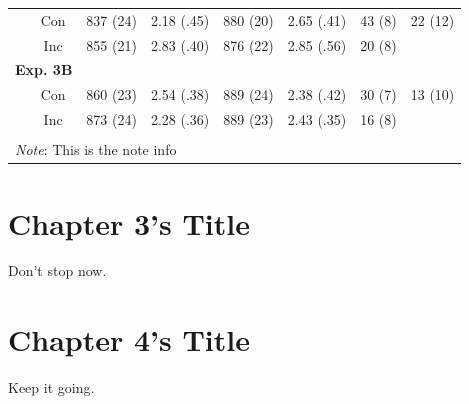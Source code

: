 \documentclass[]{DissertateCUNY}
\begin{document}
\begin{table}[htbp]
{\begin{tabular}{rrcccccc}
    & \multicolumn{1}{c}{Con} 
    & \multicolumn{1}{c}{837 (24)} 
    & \multicolumn{1}{c}{2.18 (.45)} 
    & \multicolumn{1}{c}{880 (20)} 
    & \multicolumn{1}{c}{2.65 (.41)} 
    & \multicolumn{1}{c}{43 (8)}
    & \multicolumn{1}{c}{22 (12)} \\
    & \multicolumn{1}{c}{Inc} 
    & \multicolumn{1}{c}{855 (21)} 
    & \multicolumn{1}{c}{2.83 (.40)} 
    & \multicolumn{1}{c}{876 (22)} 
    & \multicolumn{1}{c}{2.85 (.56)} 
    & \multicolumn{1}{c}{20 (8)} &  \\
    \multicolumn{2}{c}{\textbf{Exp. 3B}} &       &       &       &       &       &  \\
    & \multicolumn{1}{c}{Con} 
    & \multicolumn{1}{c}{860 (23)} 
    & \multicolumn{1}{c}{2.54 (.38)} 
    & \multicolumn{1}{c}{889 (24)} 
    & \multicolumn{1}{c}{2.38 (.42)} 
    & \multicolumn{1}{c}{30 (7)} 
    & \multicolumn{1}{c}{13 (10)} \\
    & \multicolumn{1}{c}{Inc} 
    & \multicolumn{1}{c}{873 (24)} 
    & \multicolumn{1}{c}{2.28 (.36)} 
    & \multicolumn{1}{c}{889 (23)} 
    & \multicolumn{1}{c}{2.43 (.35)} 
    & \multicolumn{1}{c}{16 (8)} &  \\
    &       &       &       &       &       &       &  \\
    \bottomrule
    \multicolumn{8}{l}{\textit{Note}: This is the note info} \\
    \end{tabular}}%
  \label{tab:addlabel}%
\end{table}

\FloatBarrier

\newpage

 \fancyhead[R]{\thepage} \fancyfoot[C]{}

\chapter{Chapter 3's Title}

Don't stop now.

\FloatBarrier
\newpage
{} \fancyhead[R]{\thepage} \fancyfoot[C]{}

\chapter{Chapter 4's Title}

Keep it going.

\FloatBarrier
\newpage
{} \fancyhead[R]{\thepage} \fancyfoot[C]{}
\end{document}
